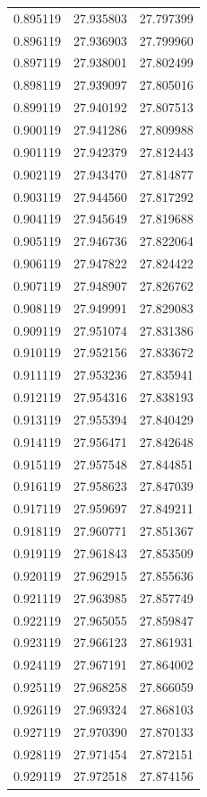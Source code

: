 \begin{tabular}{rrr}
0.895119 & 27.935803 & 27.797399 \\
0.896119 & 27.936903 & 27.799960 \\
0.897119 & 27.938001 & 27.802499 \\
0.898119 & 27.939097 & 27.805016 \\
0.899119 & 27.940192 & 27.807513 \\
0.900119 & 27.941286 & 27.809988 \\
0.901119 & 27.942379 & 27.812443 \\
0.902119 & 27.943470 & 27.814877 \\
0.903119 & 27.944560 & 27.817292 \\
0.904119 & 27.945649 & 27.819688 \\
0.905119 & 27.946736 & 27.822064 \\
0.906119 & 27.947822 & 27.824422 \\
0.907119 & 27.948907 & 27.826762 \\
0.908119 & 27.949991 & 27.829083 \\
0.909119 & 27.951074 & 27.831386 \\
0.910119 & 27.952156 & 27.833672 \\
0.911119 & 27.953236 & 27.835941 \\
0.912119 & 27.954316 & 27.838193 \\
0.913119 & 27.955394 & 27.840429 \\
0.914119 & 27.956471 & 27.842648 \\
0.915119 & 27.957548 & 27.844851 \\
0.916119 & 27.958623 & 27.847039 \\
0.917119 & 27.959697 & 27.849211 \\
0.918119 & 27.960771 & 27.851367 \\
0.919119 & 27.961843 & 27.853509 \\
0.920119 & 27.962915 & 27.855636 \\
0.921119 & 27.963985 & 27.857749 \\
0.922119 & 27.965055 & 27.859847 \\
0.923119 & 27.966123 & 27.861931 \\
0.924119 & 27.967191 & 27.864002 \\
0.925119 & 27.968258 & 27.866059 \\
0.926119 & 27.969324 & 27.868103 \\
0.927119 & 27.970390 & 27.870133 \\
0.928119 & 27.971454 & 27.872151 \\
0.929119 & 27.972518 & 27.874156 \\

\end{tabular}
